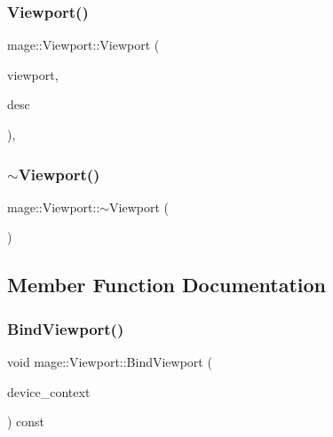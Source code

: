 \hypertarget{classmage_1_1_viewport_ab7d18e04b5c6f35a1a95af5f2e4ba971}{}\label{classmage_1_1_viewport_ab7d18e04b5c6f35a1a95af5f2e4ba971} 
\subsubsection{\texorpdfstring{Viewport()}{Viewport()}\hspace{0.1cm}{\footnotesize\ttfamily [9/9]}}
{\footnotesize\ttfamily mage\+::\+Viewport\+::\+Viewport (\begin{DoxyParamCaption}\item[{\hyperlink{classmage_1_1_viewport}{Viewport}}]{viewport,  }\item[{\hyperlink{namespacemage_a0b400065340fa5cca0ce4c2809d91af1}{A\+A\+Descriptor}}]{desc }\end{DoxyParamCaption})\hspace{0.3cm}{\ttfamily [explicit]}, {\ttfamily [noexcept]}}

\hypertarget{classmage_1_1_viewport_a6fcf68e154b186d5c6241c495cc93fe5}{}\label{classmage_1_1_viewport_a6fcf68e154b186d5c6241c495cc93fe5} 
\subsubsection{\texorpdfstring{$\sim$\+Viewport()}{~Viewport()}}
{\footnotesize\ttfamily mage\+::\+Viewport\+::$\sim$\+Viewport (\begin{DoxyParamCaption}{ }\end{DoxyParamCaption})\hspace{0.3cm}{\ttfamily [default]}}



\subsection{Member Function Documentation}
\hypertarget{classmage_1_1_viewport_a363d750cdb8c21ee5b3e68a323f914db}{}\label{classmage_1_1_viewport_a363d750cdb8c21ee5b3e68a323f914db} 
\subsubsection{\texorpdfstring{Bind\+Viewport()}{BindViewport()}}
{\footnotesize\ttfamily void mage\+::\+Viewport\+::\+Bind\+Viewport (\begin{DoxyParamCaption}\item[{I\+D3\+D11\+Device\+Context4 $\ast$}]{device\+\_\+context }\end{DoxyParamCaption}) const\hspace{0.3cm}{\ttfamily [noexcept]}}

